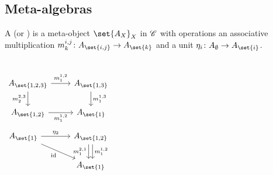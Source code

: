 \documentclass{beamer}
\theoremstyle{theorem}
\begin{document}
\subsection{Meta-algebras}

\begin{frame}
        \begin{definition}\label{def:meta_algebra}
                A  (or ) is a meta-object
                $\set{A_X}_X$ in $\mathscr{C}$ with operations an associative
                multiplication $\map {\mult^{i,j}_{k}} {A_{\set{i,j}}}
                {A_{\set{k}}}$  and a unit
                $\map{\unit_{i}}{A_{\emptyset}}{A_{\set{i}}}$.
        \end{definition}
        \begin{columns}
                \begin{equation*}\label{eq:cd_mult}
                        \begin{tikzcd}[ampersand replacement=\&]
                                A_{\set{1,2,3}}
                                \rar["\mult^{1,2}_{1}"]
                                \dar["\mult^{2,3}_{2}"']
                                \&A_{\set{1,3}}
                                \dar["\mult^{1,3}_{1}"] \\
                                A_{\set{1,2}}
                                \rar["\mult^{1,2}_{1}"']
                                \&A_{\set{1}}
                        \end{tikzcd}
                \end{equation*}
                \begin{equation*}\label{eq:cd_unit}
                \begin{tikzcd}[ampersand replacement=\&,column sep=large]
                        A_{\set{1}}
                                \rar["\unit_{2}"]
                                \drar["\id"']
                        \&A_{\set{1,2}}
                                \dar["\mult^{1,2}_{1}", shift left]
                                \dar["\mult^{2,1}_{1}"', shift right] \\
                        \&A_{\set{1}}
                \end{tikzcd}
                \end{equation*}
        \end{columns}
\end{frame}
\end{document}
